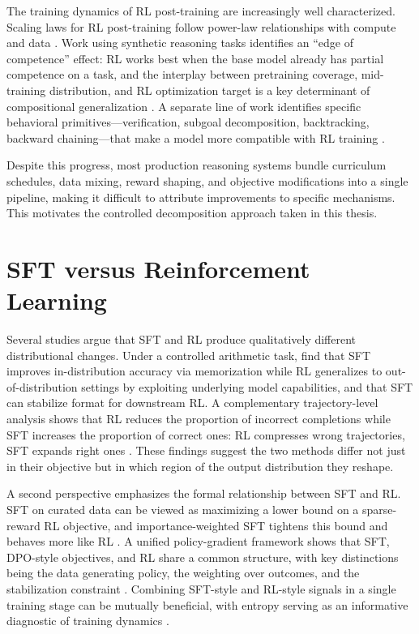\documentclass[12pt]{cmuthesis}
\begin{document}
The training dynamics of RL post-training are increasingly well characterized.
Scaling laws for RL post-training follow power-law relationships with compute and data \citep{tanScalingBehaviorsLLM2025}.
Work using synthetic reasoning tasks identifies an ``edge of competence'' effect: RL works best when the base model already has partial competence on a task, and the interplay between pretraining coverage, mid-training distribution, and RL optimization target is a key determinant of compositional generalization \citep{zhangInterplayPreTrainingMidTraining2025}.
A separate line of work identifies specific behavioral primitives---verification, subgoal decomposition, backtracking, backward chaining---that make a model more compatible with RL training \citep{gandhiCognitiveBehaviorsThat2025}.

Despite this progress, most production reasoning systems bundle curriculum schedules, data mixing, reward shaping, and objective modifications into a single pipeline, making it difficult to attribute improvements to specific mechanisms.
This motivates the controlled decomposition approach taken in this thesis.

\section{SFT versus Reinforcement Learning}

Several studies argue that SFT and RL produce qualitatively different distributional changes.
Under a controlled arithmetic task, \citet{chuSFTMemorizesRL2025} find that SFT improves in-distribution accuracy via memorization while RL generalizes to out-of-distribution settings by exploiting underlying model capabilities, and that SFT can stabilize format for downstream RL.
A complementary trajectory-level analysis shows that RL reduces the proportion of incorrect completions while SFT increases the proportion of correct ones: RL compresses wrong trajectories, SFT expands right ones \citep{matsutaniRLSqueezesSFT2025}.
These findings suggest the two methods differ not just in their objective but in which region of the output distribution they reshape.

A second perspective emphasizes the formal relationship between SFT and RL.
SFT on curated data can be viewed as maximizing a lower bound on a sparse-reward RL objective, and importance-weighted SFT tightens this bound and behaves more like RL \citep{qinSupervisedFineTuning2025}.
A unified policy-gradient framework shows that SFT, DPO-style objectives, and RL share a common structure, with key distinctions being the data generating policy, the weighting over outcomes, and the stabilization constraint \citep{lvUnifiedViewLarge2026}.
Combining SFT-style and RL-style signals in a single training stage can be mutually beneficial, with entropy serving as an informative diagnostic of training dynamics \citep{fuSRFTSingleStageMethod2025}.
\end{document}
